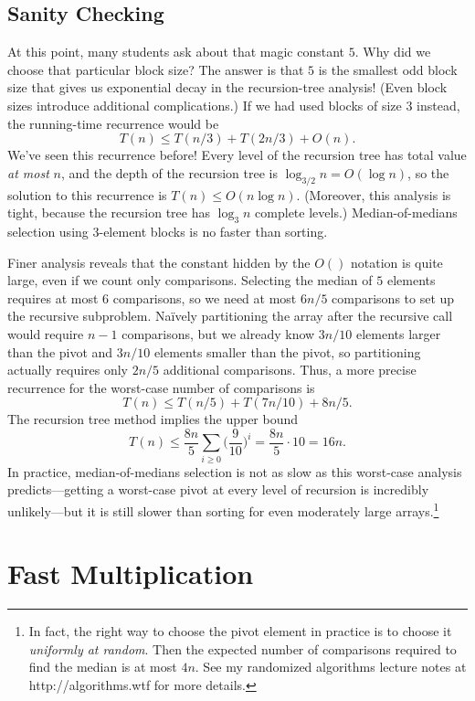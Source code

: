 \subsection{Sanity Checking}
At this point, many students ask about that magic constant $5$. Why did we choose that particular block size? The answer is that $5$ is the smallest odd block size that gives us exponential decay in the recursion-tree analysis! (Even block sizes introduce additional complications.) If we had used blocks of size $3$ instead, the running-time recurrence would be
\[
T(n) \le T(n/3) + T(2n/3) + O(n).
\]
We’ve seen this recurrence before! Every level of the recursion tree has total value \emph{at most} $n$, and the depth of the recursion tree is $\log_{3/2} n = O(\log n)$, so the solution to this recurrence is $T(n) \le O(n \log n)$. (Moreover, this analysis is tight, because the recursion tree has $\log_3 n$ complete levels.) Median-of-medians selection using $3$-element blocks is no faster than sorting.

Finer analysis reveals that the constant hidden by the $O()$ notation is quite large, even if we count only comparisons. Selecting the median of $5$ elements requires at most $6$ comparisons, so we need at most $6n/5$ comparisons to set up the recursive subproblem. Naïvely partitioning the array after the recursive call would require $n - 1$ comparisons, but we already know $3n/10$ elements larger than the pivot and $3n/10$ elements smaller than the pivot, so partitioning actually requires only $2n/5$ additional comparisons. Thus, a more precise recurrence for the worst-case number of comparisons is
\[
T(n) \le T(n/5) + T(7n/10) + 8n/5.
\]
The recursion tree method implies the upper bound
\[
T(n) \le \frac{8n}{5} \sum_{i \ge 0} \biggl(\frac{9}{10}\biggr)^i = \frac{8n}{5} \cdot 10 = 16n.
\]
In practice, median-of-medians selection is not as slow as this worst-case analysis predicts—getting a worst-case pivot at every level of recursion is incredibly unlikely—but it is still slower than sorting for even moderately large arrays.\footnote{In fact, the right way to choose the pivot element in practice is to choose it \emph{uniformly at random}. Then the expected number of comparisons required to find the median is at most $4n$. See my randomized algorithms lecture notes at http://algorithms.wtf for more details.}

\section{Fast Multiplication}
\label{sec:1.9}

